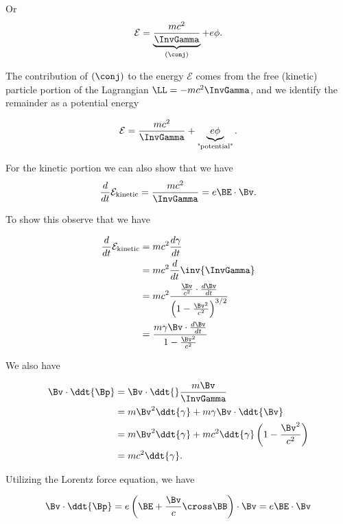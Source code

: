 Or
\begin{equation}\label{eqn:relativisticElectrodynamicsL10:n}
\mathcal{E} = \underbrace{\frac{m c^2}{\InvGamma}}_{(\conj)} + e \phi.
\end{equation}

The contribution of $(\conj)$ to the energy $\mathcal{E}$ comes from the free (kinetic) particle portion of the Lagrangian $\LL = -m c^2 \InvGamma$, and we identify the remainder as a potential energy 

\begin{equation}\label{eqn:relativisticElectrodynamicsL10:n}
\mathcal{E} = \frac{m c^2}{\InvGamma} + \underbrace{e \phi}_{\text{"potential"}}.
\end{equation}

For the kinetic portion we can also show that we have
\begin{equation}\label{eqn:relativisticElectrodynamicsL10:n}
\frac{d}{dt} \mathcal{E}_{\text{kinetic}} 
=
\frac{m c^2}{\InvGamma} 
= e \BE \cdot \Bv.
\end{equation}

To show this observe that we have

\begin{align*}
\frac{d}{dt} \mathcal{E}_{\text{kinetic}} 
&= m c^2 \frac{d\gamma}{dt} \\
&= m c^2 \frac{d}{dt} \inv{\InvGamma} \\
&= m c^2 \frac{\frac{\Bv}{c^2} \cdot \frac{d\Bv}{dt}}{\left(1 - \frac{\Bv^2}{c^2}\right)^{3/2}} \\
&= \frac{m \gamma \Bv \cdot \frac{d\Bv}{dt}}{1 - \frac{\Bv^2}{c^2}}
\end{align*}

We also have

\begin{align*}
\Bv \cdot \ddt{\Bp} 
&= \Bv \cdot \ddt{} \frac{m \Bv}{\InvGamma} \\
&= m\Bv^2 \ddt{\gamma} + m \gamma \Bv \cdot \ddt{\Bv} \\
&= m\Bv^2 \ddt{\gamma} + m c^2 \ddt{\gamma} \left( 1 - \frac{\Bv^2}{c^2} \right) \\
&= m c^2 \ddt{\gamma}.
\end{align*}

Utilizing the Lorentz force equation, we have

\begin{equation}\label{eqn:relativisticElectrodynamicsL10:n}
\Bv \cdot \ddt{\Bp} = e \left( \BE + \frac{\Bv}{c} \cross \BB \right) \cdot \Bv = e \BE \cdot \Bv
\end{equation}

